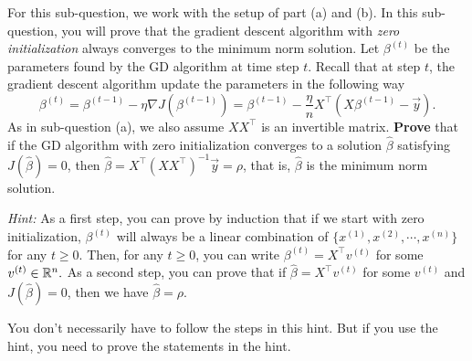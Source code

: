 \item{} For this sub-question, we work with the setup of part (a) and (b). In this sub-question, you will prove that the gradient descent algorithm with \emph{zero initialization} always converges to the minimum norm solution. Let $\beta^{(t)}$ be the parameters found by the GD algorithm at time step $t$. Recall that at step $t$, the gradient descent algorithm update the parameters in the following way
\begin{equation}
	\beta^{(t)}=\beta^{(t-1)}-\eta\nabla J(\beta^{(t-1)})=\beta^{(t-1)}-\frac{\eta}{n} X^\top (X\beta^{(t-1)}-\vec{y}).
\end{equation}
As in sub-question (a), we also assume $X X^\top$ is an invertible matrix. \textbf{Prove} that if the GD algorithm  with zero initialization converges to a solution $\hat{\beta}$ satisfying $J(\hat{\beta})=0$, then $\hat{\beta}=X^\top(XX^\top)^{-1}\vec{y}=\rho$, that is, $\hat{\beta}$ is the minimum norm solution.

\emph{Hint:} As a first step, you can prove by induction that if we start with zero initialization, $\beta^{(t)}$ will always be a linear combination of $\{x^{(1)}, x^{(2)}, \cdots, x^{(n)}\}$ for any $t\ge 0.$ Then, for any $t\ge 0$, you can write $\beta^{(t)}=X^\top v^{(t)}$ for some $v^{(t)}\in \mathbb{R}^{n}.$ As a second step, you can prove that if $\hat{\beta}=X^\top v^{(t)}$ for some $v^{(t)}$ and $J(\hat{\beta})=0$, then we have $\hat{\beta}=\rho.$

You don't necessarily have to follow the steps in this hint. But if you use the hint, you need to prove the statements in the hint.
